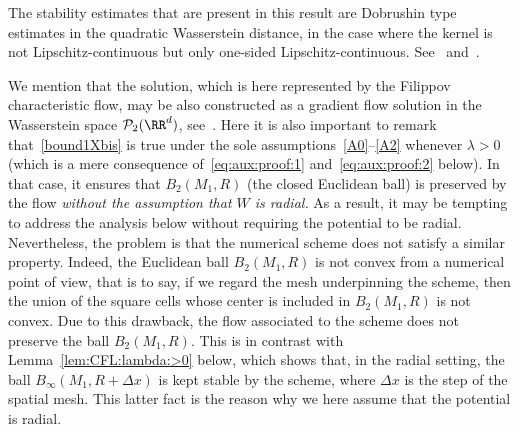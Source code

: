 The stability estimates that are present in this result are Dobrushin type estimates in the quadratic Wasserstein distance, in the case where the kernel is not Lipschitz-continuous but only one-sided Lipschitz-continuous. See~\cite{dob} and~\cite{Golse}.

We mention that the solution, which is here represented by the Filippov characteristic flow, may be also constructed as a gradient flow solution in the Wasserstein space ${\mathcal P}_{2}(\RR^d)$, see~\cite{Carrillo}. Here it is also important to remark that~\eqref{bound1Xbis} is true under the sole assumptions~\eqref{A0}--\eqref{A2} whenever $\lambda >0$ (which is a mere consequence of~\eqref{eq:aux:proof:1} and~\eqref{eq:aux:proof:2} below). In that case, it ensures that $B_2(M_1,R)$ (the closed Euclidean ball) is preserved by the flow \emph{without the assumption that $W$ is radial.} As a result, it may be tempting to address the analysis below without requiring the potential to be radial. Nevertheless, the problem is that the numerical scheme does not satisfy a similar property. Indeed, the Euclidean ball $B_2(M_1,R)$ is not convex from a numerical point of view, that is to say, if we regard the mesh underpinning the scheme, then the union of the square cells whose center is included in $B_2(M_1,R)$ is not convex. Due to this drawback, the flow associated to the scheme does not preserve the ball $B_2(M_1,R)$. This is in contrast with Lemma~\ref{lem:CFL:lambda:>0} below, which shows that, in the radial setting, the ball $B_\infty(M_1,R+\Delta x)$ is kept stable by the scheme, where $\Delta x$ is the step of the spatial mesh. This latter fact is the reason why we here assume that the potential is radial.

